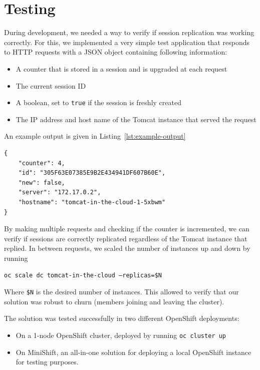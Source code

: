 \documentclass[11pt,a4paper]{article}
\begin{document}

\section{Testing}

During development, we needed a way to verify if session replication was working correctly. For this, we implemented a very simple test application that responds to HTTP requests with a JSON object containing following information:

\begin{itemize}
    \item A counter that is stored in a session and is upgraded at each request
    \item The current session ID
    \item A boolean, set to \texttt{true} if the session is freshly created
    \item The IP address and host name of the Tomcat instance that served the request
\end{itemize}

An example output is given in Listing~\ref{lst:example-output}

\begin{lstlisting}[caption=Example output,label=lst:example-output]
{
    "counter": 4,
    "id": "305F63E07385E9B2E434941DF607B60E",
    "new": false,
    "server": "172.17.0.2",
    "hostname": "tomcat-in-the-cloud-1-5xbwm"
}
\end{lstlisting}

By making multiple requests and checking if the counter is incremented, we can verify if sessions are correctly replicated regardless of the Tomcat instance that replied. In between requests, we scaled the number of instances up and down by running

\texttt{oc scale dc tomcat-in-the-cloud --replicas=\$N}

Where \texttt{\$N} is the desired number of instances. This allowed to verify that our solution was robust to churn (members joining and leaving the cluster).

The solution was tested successfully in two different OpenShift deployments:
\begin{itemize}
    \item On a 1-node OpenShift cluster, deployed by running \texttt{oc cluster up}
    \item On MiniShift\autocite{minishift}, an all-in-one solution for deploying a local OpenShift instance for testing purposes.
\end{itemize}
\end{document}
